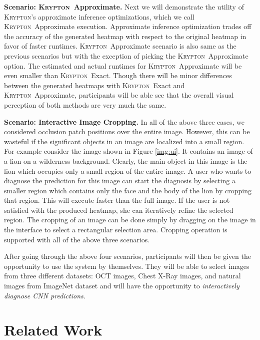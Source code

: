 \documentclass{vldb}
\newcommand{\system}{\textsc{Krypton}}
\begin{document}
\vspace{2mm}
\noindent \textbf{Scenario: \system~Approximate.} Next we will demonstrate the utility of \system's approximate inference optimizations, which we call \system~Approximate execution.
Approximate inference optimization trades off the accuracy of the generated heatmap with respect to the original heatmap in favor of faster runtimes.
\system~Approximate scenario is also same as the previous scenarios but with the exception of picking the \system~Approximate option.
The estimated and actual runtimes for \system~Approximate will be even smaller than \system~Exact.
Though there will be minor differences between the generated heatmaps with \system~Exact and \system~Approximate, participants will be able see that the overall visual perception of both methods are very much the same.

\vspace{2mm}
\noindent \textbf{Scenario: Interactive Image Cropping.} In all of the above three cases, we considered occlusion patch positions over the entire image.
However, this can be wasteful if the significant objects in an image are localized into a small region.
For example consider the image shown in Figure \ref{img:ui}.
It contains an image of a lion on a wilderness background.
Clearly, the main object in this image is the lion which occupies only a small region of the entire image.
A user who wants to diagnose the prediction for this image can start the diagnosis by selecting a smaller region which contains only the face and the body of the lion by cropping that region.
This will execute faster than the full image.
If the user is not satisfied with the produced heatmap, she can iteratively refine the selected region.
The cropping of an image can be done simply by dragging on the image in the interface to select a rectangular selection area.
Cropping operation is supported with all of the above three scenarios.

\vspace{2mm}
After going through the above four scenarios, participants will then be given the opportunity to use the system by themselves.
They will be able to select images from three different datasets: OCT images, Chest X-Ray images, and natural images from ImageNet dataset and will have the opportunity to \textit{interactively diagnose CNN predictions}.

\vspace{-2mm}
\section{Related Work}
\end{document}
